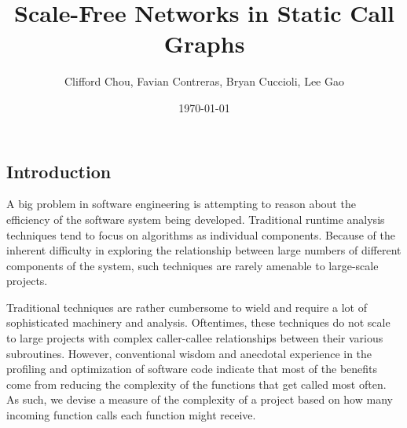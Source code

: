 \documentclass[11pt,a4paper,twocolumn]{article}
\author{Clifford Chou, Favian Contreras, Bryan Cuccioli, Lee Gao}
\title{Scale-Free Networks in Static Call Graphs}
\date{\today}
\begin{document}
\begin{singlespace}


\section{Introduction}

A big problem in software engineering is attempting to reason about
the efficiency of the software system being developed. Traditional runtime
analysis techniques tend to focus on algorithms as individual components.
Because of the inherent difficulty in exploring the relationship between
large numbers of different components of the system, such techniques are
rarely amenable to large-scale projects.

Traditional techniques are rather cumbersome to wield and require a lot of
sophisticated machinery and analysis.
Oftentimes, these techniques do not scale to large
projects with complex caller-callee relationships between their various subroutines.
However, conventional wisdom and anecdotal experience in the profiling and
optimization of software code indicate
that most of the benefits come from reducing the complexity of
the functions that get called most often. As such, we devise a measure of the
complexity of a project based on how many incoming function calls each
function might receive.


\end{singlespace}
\end{document}
